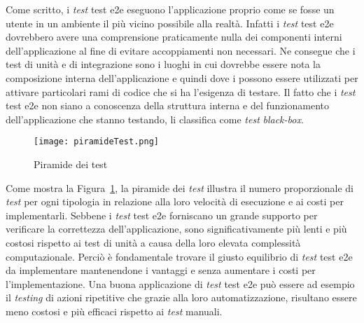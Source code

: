 Come scritto, i \emph{test} \gls{test e2e} eseguono l'applicazione proprio come se fosse un utente in un ambiente il più vicino possibile alla realtà. Infatti i \emph{test} \gls{test e2e} dovrebbero avere una comprensione praticamente nulla dei componenti interni dell'applicazione al fine di evitare accoppiamenti non necessari. Ne consegue che i test di unità e di integrazione sono i luoghi in cui dovrebbe essere nota la composizione interna dell'applicazione e quindi dove i  possono essere utilizzati per attivare particolari rami di codice che si ha l'esigenza di testare. Il fatto che i \emph{test} \gls{test e2e} non siano a conoscenza della struttura interna e del funzionamento dell'applicazione che stanno testando, li classifica come \emph{test} \emph{black-box}.
\clearpage

\begin{figure}[!h] 
	\begin{center}
		\texttt{[image: piramideTest.png]}
		\caption{Piramide dei test}\label{fig:test}
	\end{center}
\end{figure}

Come mostra la Figura~\ref{fig:test}, la piramide dei \emph{test} illustra il numero proporzionale di \emph{test} per ogni tipologia in relazione alla loro velocità di esecuzione e ai costi per implementarli. Sebbene i \emph{test} \gls{test e2e} forniscano un grande supporto per verificare la correttezza dell'applicazione, sono significativamente più lenti e più costosi rispetto ai test di unità a causa della loro elevata complessità computazionale. Perciò è fondamentale trovare il giusto equilibrio di \emph{test} \gls{test e2e} da implementare mantenendone i vantaggi e senza aumentare i costi per l'implementazione. Una buona applicazione di \emph{test} \gls{test e2e} può essere ad esempio il \emph{testing} di azioni ripetitive che grazie alla loro automatizzazione, risultano essere meno costosi e più efficaci rispetto ai \emph{test} manuali.

